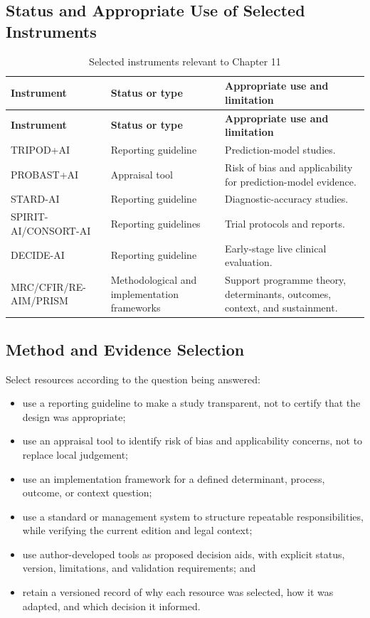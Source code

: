 \subsection{Status and Appropriate Use of Selected Instruments}
\begin{longtable}{@{}p{}p{}p{}@{}}
\caption{Selected instruments relevant to Chapter 11}
\label{tab:comp-ch11-instrument-status}\\
\toprule
\textbf{Instrument} & \textbf{Status or type} & \textbf{Appropriate use and limitation} \\
\midrule
\endfirsthead
\toprule
\textbf{Instrument} & \textbf{Status or type} & \textbf{Appropriate use and limitation} \\
\midrule
\endhead
\bottomrule
\endlastfoot
TRIPOD+AI & Reporting guideline & Prediction-model studies. \\
PROBAST+AI & Appraisal tool & Risk of bias and applicability for prediction-model evidence. \\
STARD-AI & Reporting guideline & Diagnostic-accuracy studies. \\
SPIRIT-AI/CONSORT-AI & Reporting guidelines & Trial protocols and reports. \\
DECIDE-AI & Reporting guideline & Early-stage live clinical evaluation. \\
MRC/CFIR/RE-AIM/PRISM & Methodological and implementation frameworks & Support programme theory, determinants, outcomes, context, and sustainment. \\
\end{longtable}

\subsection{Method and Evidence Selection}
Select resources according to the question being answered:
\begin{itemize}
 \item use a reporting guideline to make a study transparent, not to certify that the design was appropriate;
 \item use an appraisal tool to identify risk of bias and applicability concerns, not to replace local judgement;
 \item use an implementation framework for a defined determinant, process, outcome, or context question;
 \item use a standard or management system to structure repeatable responsibilities, while verifying the current edition and legal context;
 \item use author-developed tools as proposed decision aids, with explicit status, version, limitations, and validation requirements; and
 \item retain a versioned record of why each resource was selected, how it was adapted, and which decision it informed.
\end{itemize}

